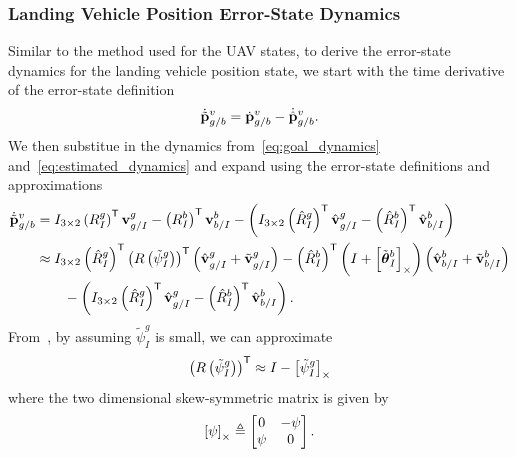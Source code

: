 \subsubsection{Landing Vehicle Position Error-State Dynamics}
Similar to the method used for the UAV states, to derive the error-state
dynamics for the landing vehicle position state, we start with the time
derivative of the error-state definition
\begin{equation}
  \dot{\tilde{\boldsymbol{\mathrm{p}}}}_{g/b}^{v} = \dot{\boldsymbol{\mathrm{p}}}_{g/b}^{v} -
  \dot{\hat{\boldsymbol{\mathrm{p}}}}_{g/b}^{v}.
\end{equation}
We then substitue in the dynamics from~\eqref{eq:goal_dynamics}
and~\eqref{eq:estimated_dynamics} and expand using the error-state definitions
and approximations
\begin{align}
  \dot{\tilde{\boldsymbol{\mathrm{p}}}}_{g/b}^{v}
  &=
  I_{3 \times 2} \left( R_{I}^{g} \right)^{\mathsf{T}}
  \boldsymbol{\mathrm{v}}_{g/I}^{g} - \left( R_{I}^{b} \right)^{\mathsf{T}}
  \boldsymbol{\mathrm{v}}_{b/I}^{b}
  -
  \left(
  I_{3 \times 2} \left( \hat{R}_{I}^{g} \right)^{\mathsf{T}}
  \hat{\boldsymbol{\mathrm{v}}}_{g/I}^{g} - \left( \hat{R}_{I}^{b} \right)^{\mathsf{T}}
  \hat{\boldsymbol{\mathrm{v}}}_{b/I}^{b}
  \right) \\
  &\approx
  \label{eq:goal_pos_err_state1}
  I_{3 \times 2} \left( \hat{R}_{I}^{g} \right)^{\mathsf{T}}
  \left( R \left( \tilde{\psi}_{I}^{g} \right) \right)^{\mathsf{T}}
  \left( \hat{\boldsymbol{\mathrm{v}}}_{g/I}^{g} + \tilde{\boldsymbol{\mathrm{v}}}_{g/I}^{g} \right) - \left(
  \hat{R}_{I}^{b} \right)^{\mathsf{T}}
  \left( I + \left[ \tilde{\boldsymbol{\mathrm{\theta}}}_I^b \right]_{\times} \right)
  \left( \hat{\boldsymbol{\mathrm{v}}}_{b/I}^{b} + \tilde{\boldsymbol{\mathrm{v}}}_{b/I}^{b} \right) \\
  & \qquad -
  \left(
  I_{3 \times 2} \left( \hat{R}_{I}^{g} \right)^{\mathsf{T}}
  \hat{\boldsymbol{\mathrm{v}}}_{g/I}^{g} - \left( \hat{R}_{I}^{b} \right)^{\mathsf{T}}
  \hat{\boldsymbol{\mathrm{v}}}_{b/I}^{b}
  \right). \nonumber
\end{align}
From~\cite{sola2018micro}, by assuming $\tilde{\psi}_I^g$ is small, we can approximate 
\begin{equation}
  \left( R \left( \tilde{\psi}_I^g \right) \right)^{\mathsf{T}} \approx I -
  \left[ \tilde{\psi}_I^g \right]_{\times}
  \label{eq:2d_err_rot_approx}
\end{equation}
where the two dimensional skew-symmetric matrix is given by
\begin{equation}
  \left[ \psi \right]_{\times} \triangleq
  \begin{bmatrix}
    0 & -\psi \\
    \psi & 0
  \end{bmatrix}.
\end{equation}

